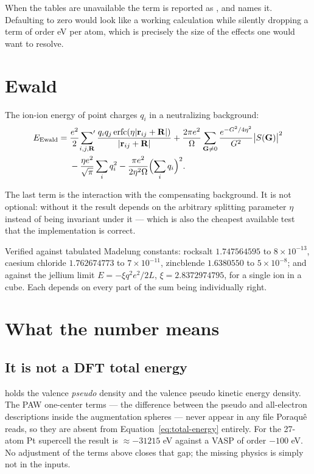 \begin{pnote}
When the tables are unavailable the term is reported as , and
 names it. Defaulting to zero would look like a
working calculation while silently dropping a term of order eV per atom, which
is precisely the size of the effects one would want to resolve.
\end{pnote}

\section{Ewald}

The ion-ion energy of point charges $q_i$ in a neutralizing background:
\begin{align}
  E_{\rm Ewald} = {}& \frac{e^2}{2}\sideset{}{'}\sum_{i,j,\mathbf{R}}
      \frac{q_iq_j\,\mathrm{erfc}(\eta|\mathbf{r}_{ij}+\mathbf{R}|)}{|\mathbf{r}_{ij}+\mathbf{R}|}
    + \frac{2\pi e^2}{\Omega}\sum_{\mathbf{G}\neq0}
      \frac{e^{-G^2/4\eta^2}}{G^2}\bigl|S(\mathbf{G})\bigr|^2 \nonumber\\
   & - \frac{\eta e^2}{\sqrt\pi}\sum_i q_i^2
     - \frac{\pi e^2}{2\eta^2\Omega}\Bigl(\sum_i q_i\Bigr)^2 .
\end{align}

The last term is the interaction with the compensating background. It is not
optional: without it the result depends on the arbitrary splitting parameter
$\eta$ instead of being invariant under it --- which is also the cheapest
available test that the implementation is correct.

\begin{ptip}
Verified against tabulated Madelung constants: rocksalt $1.747564595$ to
$8\times10^{-13}$, caesium chloride $1.762674773$ to $7\times10^{-11}$,
zincblende $1.6380550$ to $5\times10^{-8}$; and against the jellium limit
$E = -\xi q^2e^2/2L$, $\xi = 2.8372974795$, for a single ion in a cube. Each
depends on every part of the sum being individually right.
\end{ptip}

\section{What the number means}
\label{sec:energy-meaning}

\subsection{It is not a DFT total energy}

 holds the valence \emph{pseudo} density and  the
valence pseudo kinetic energy density. The PAW one-center terms --- the
difference between the pseudo and all-electron descriptions inside the
augmentation spheres --- never appear in any file Poraqu\^e reads, so they are
absent from Equation~\ref{eq:total-energy} entirely. For the 27-atom Pt
supercell the result is $\approx -31215$ eV against a VASP  of order
$-100$ eV. No adjustment of the terms above closes that gap; the missing
physics is simply not in the inputs.

